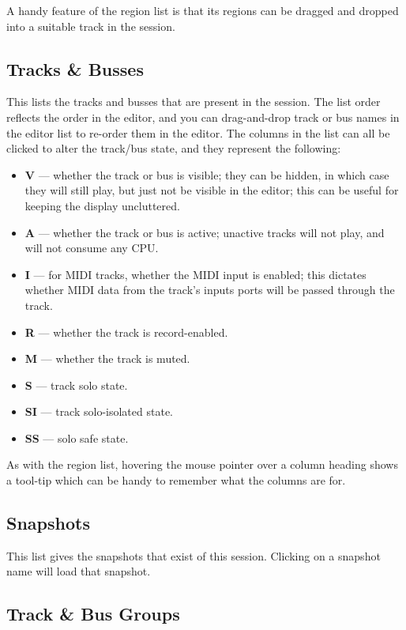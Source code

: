 \documentclass[10pt,a4paper]{book}
\begin{document}
{A handy feature of the region list is that its regions can be dragged
and dropped into a suitable track in the session.

\subsection{Tracks \& Busses}

This lists the tracks and busses that are present in the session.  The
list order reflects the order in the editor, and you can drag-and-drop
track or bus names in the editor list to re-order them in the editor.
The columns in the list can all be clicked to alter the track/bus
state, and they represent the following:

\begin{itemize}
\item \textbf{V} --- whether the track or bus is visible; they can be
  hidden, in which case they will still play, but just not be visible
  in the editor; this can be useful for keeping the display uncluttered.
\item \textbf{A} --- whether the track or bus is active; unactive
  tracks will not play, and will not consume any CPU\@.
\item \textbf{I} --- for MIDI tracks, whether the MIDI input is
  enabled; this dictates whether MIDI data from the track's inputs
  ports will be passed through the track.
\item \textbf{R} --- whether the track is record-enabled.
\item \textbf{M} --- whether the track is muted.
\item \textbf{S} --- track solo state.
\item \textbf{SI} --- track solo-isolated state.
\item \textbf{SS} --- solo safe state.
\end{itemize}

As with the region list, hovering the mouse pointer over a column
heading shows a tool-tip which can be handy to remember what the
columns are for.

\subsection{Snapshots}

This list gives the snapshots that exist of this session.  Clicking on
a snapshot name will load that snapshot.

\subsection{Track \& Bus Groups}

}
\end{document}
